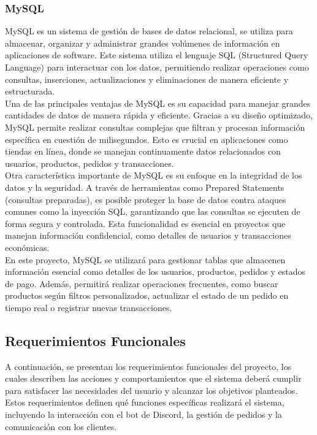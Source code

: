 \documentclass[a4paper,12pt]{article}
\begin{document}
\subsubsection{MySQL}

MySQL es un sistema de gestión de bases de datos relacional, se utiliza para almacenar, organizar y administrar grandes volúmenes de información en aplicaciones de software. Este sistema utiliza el lenguaje SQL (Structured Query Language) para interactuar con los datos, permitiendo realizar operaciones como consultas, inserciones, actualizaciones y eliminaciones de manera eficiente y estructurada. \\

Una de las principales ventajas de MySQL es su capacidad para manejar grandes cantidades de datos de manera rápida y eficiente. Gracias a su diseño optimizado, MySQL permite realizar consultas complejas que filtran y procesan información específica en cuestión de milisegundos. Esto es crucial en aplicaciones como tiendas en línea, donde se manejan continuamente datos relacionados con usuarios, productos, pedidos y transacciones.\\

Otra característica importante de MySQL es su enfoque en la integridad de los datos y la seguridad. A través de herramientas como Prepared Statements (consultas preparadas), es posible proteger la base de datos contra ataques comunes como la inyección SQL, garantizando que las consultas se ejecuten de forma segura y controlada. Esta funcionalidad es esencial en proyectos que manejan información confidencial, como detalles de usuarios y transacciones económicas.\\

En este proyecto, MySQL se utilizará para gestionar tablas que almacenen información esencial como detalles de los usuarios, productos, pedidos y estados de pago. Además, permitirá realizar operaciones frecuentes, como buscar productos según filtros personalizados, actualizar el estado de un pedido en tiempo real o registrar nuevas transacciones.\\
\newpage
\subsection{Requerimientos Funcionales}
A continuación, se presentan los requerimientos funcionales del proyecto, los cuales describen las acciones y comportamientos que el sistema deberá cumplir para satisfacer las necesidades del usuario y alcanzar los objetivos planteados. Estos requerimientos definen qué funciones específicas realizará el sistema, incluyendo la interacción con el bot de Discord, la gestión de pedidos y la comunicación con los clientes.\\
\end{document}
